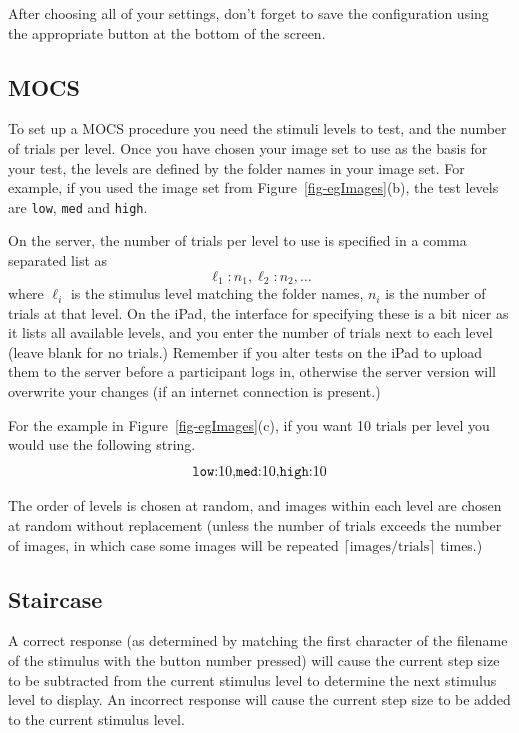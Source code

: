 \documentclass{article}
\begin{document}
After choosing all of your settings, don't forget to save the configuration 
using the appropriate button at the bottom of the screen.

\subsection{MOCS}
\label{sec-mocs}

To set up a MOCS procedure you need the stimuli levels to test, and the
number of trials per level.
Once you have chosen your image set to use as the basis for your test,
the levels are defined by the folder names in your image set.
For example, if you used the image set from Figure~\ref{fig-egImages}(b),
the test levels are {\tt low}, {\tt med} and {\tt high}.

On the server, the number of trials per level to use is specified in 
a comma separated list as
$$
{\ell_1}{:}{n_1}{,}{\ell_2}{:}{n_2}{,}\ldots
$$
where $\ell_i$ is the stimulus level matching the folder names, $n_i$ is the number of trials at that
level.
On the iPad, the interface for specifying these is a bit nicer as it lists all available levels, and
you enter the number of trials next to each level (leave blank for no trials.)
Remember if you alter tests on the iPad to upload them to the server before a participant logs in,
otherwise the server version will overwrite your changes (if an internet connection is present.)

For the example in Figure~\ref{fig-egImages}(c), if you want 10 trials per level you would use the
following string.
$$
\mbox{\tt low}{:}10{,}\mbox{\tt med}{:}10{,}\mbox{\tt high}{:}10
$$

The order of levels is chosen at random, and images within each level are chosen at random without
replacement (unless the number of trials exceeds the number of images, in which case some images will
be repeated $\lceil\mbox{images}/\mbox{trials}\rceil$ times.)

\subsection{Staircase}
\label{sec-staircase}

A correct response (as determined by matching the first character of the 
filename of the stimulus with the button number pressed) will cause the
current step size to be subtracted from the current stimulus level to
determine the next stimulus level to display.
An incorrect response 
will cause the
current step size to be added to the current stimulus level.
\end{document}
